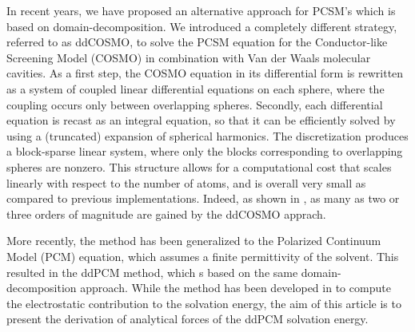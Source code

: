 In recent years, we have proposed an alternative approach for PCSM's which is based on  domain-decomposition. We introduced a completely different strategy\cite{Cances_JCP_ddCOSMO}, referred to as ddCOSMO\cite{Cances_JCP_ddCOSMO,Lipparini_JCTC_ddCOSMO,Lipparini_JPCL_ddCOSMO,Lipparini_JCP_ddCOSMO-QM}, to solve the PCSM equation for the Conductor-like Screening Model\cite{Klamt_JCS_Cosmo} (COSMO) in combination with Van der Waals molecular cavities. 
As a first step, the COSMO equation in its differential form is rewritten as a system of coupled linear differential equations on each sphere, where the coupling occurs only between overlapping spheres. Secondly, each differential equation is recast as an integral equation, so that it can be efficiently solved by using a (truncated) expansion of spherical harmonics\cite{Cances_JCP_ddCOSMO}. The discretization produces a block-sparse linear system\cite{Lipparini_JCTC_ddCOSMO}, where only the blocks corresponding to overlapping spheres are nonzero. This structure allows for a computational cost that scales linearly with respect to the number of atoms, and is overall very small as compared to previous implementations. Indeed, as shown in \cite{Lipparini_JPCL_ddCOSMO}, as many as two or three orders of magnitude are gained by the ddCOSMO apprach.

More recently, the method has been generalized to the Polarized Continuum Model (PCM) equation, which assumes a finite permittivity of the solvent. This resulted in the ddPCM method\cite{Stamm_JCP_DDPCM}, which s based on the same domain-decomposition approach. 
While the method has been developed in \cite{Stamm_JCP_DDPCM} to compute the electrostatic contribution to the solvation energy, the aim of this article is to present the derivation of analytical forces of the ddPCM solvation energy.

